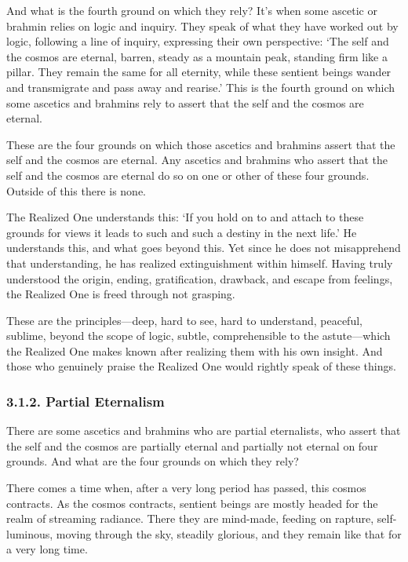 \documentclass[12pt,openany]{book}%
\begin{document}
And what is the fourth ground on which they rely? It’s when some ascetic or brahmin relies on logic and inquiry. They speak of what they have worked out by logic, following a line of inquiry, expressing their own perspective: ‘The self and the cosmos are eternal, barren, steady as a mountain peak, standing firm like a pillar. They remain the same for all eternity, while these sentient beings wander and transmigrate and pass away and rearise.’ This is the fourth ground on which some ascetics and brahmins rely to assert that the self and the cosmos are eternal. 

These are the four grounds on which those ascetics and brahmins assert that the self and the cosmos are eternal. Any ascetics and brahmins who assert that the self and the cosmos are eternal do so on one or other of these four grounds. Outside of this there is none. 

The Realized One understands this: ‘If you hold on to and attach to these grounds for views it leads to such and such a destiny in the next life.’ He understands this, and what goes beyond this. Yet since he does not misapprehend that understanding, he has realized extinguishment within himself. Having truly understood the origin, ending, gratification, drawback, and escape from feelings, the Realized One is freed through not grasping. 

These are the principles—deep, hard to see, hard to understand, peaceful, sublime, beyond the scope of logic, subtle, comprehensible to the astute—which the Realized One makes known after realizing them with his own insight. And those who genuinely praise the Realized One would rightly speak of these things. 

\subsubsection*{3.1.2. Partial Eternalism }

There are some ascetics and brahmins who are partial eternalists, who assert that the self and the cosmos are partially eternal and partially not eternal on four grounds. And what are the four grounds on which they rely? 

There comes a time when, after a very long period has passed, this cosmos contracts. As the cosmos contracts, sentient beings are mostly headed for the realm of streaming radiance. There they are mind-made, feeding on rapture, self-luminous, moving through the sky, steadily glorious, and they remain like that for a very long time. 
\end{document}

